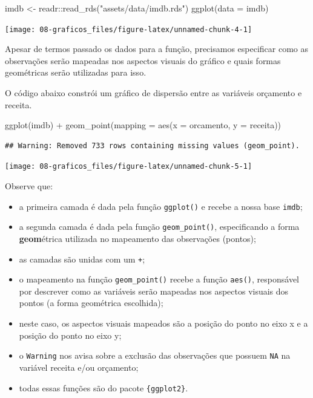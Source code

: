 \documentclass[
]{book}
\newenvironment{Shaded}{\begin{snugshade}}{\end{snugshade}}
\newcommand{\AttributeTok}[1]{\textcolor[rgb]{0.77,0.63,0.00}{#1}}
\newcommand{\FunctionTok}[1]{\textcolor[rgb]{0.00,0.00,0.00}{#1}}
\newcommand{\NormalTok}[1]{#1}
\newcommand{\OtherTok}[1]{\textcolor[rgb]{0.56,0.35,0.01}{#1}}
\newcommand{\SpecialCharTok}[1]{\textcolor[rgb]{0.00,0.00,0.00}{#1}}
\newcommand{\StringTok}[1]{\textcolor[rgb]{0.31,0.60,0.02}{#1}}
\providecommand{\tightlist}{%
  \setlength{\itemsep}{0pt}\setlength{\parskip}{0pt}}
\begin{document}
\begin{Shaded}
\begin{Highlighting}[]
\NormalTok{imdb }\OtherTok{\textless{}{-}}\NormalTok{ readr}\SpecialCharTok{::}\FunctionTok{read\_rds}\NormalTok{(}\StringTok{"assets/data/imdb.rds"}\NormalTok{)}
\FunctionTok{ggplot}\NormalTok{(}\AttributeTok{data =}\NormalTok{ imdb)}
\end{Highlighting}
\end{Shaded}

\begin{center}\texttt{[image: 08-graficos\_files/figure-latex/unnamed-chunk-4-1]} \end{center}

Apesar de termos passado os dados para a função, precisamos especificar como as observações serão mapeadas nos aspectos visuais do gráfico e quais formas geométricas serão utilizadas para isso.

O código abaixo constrói um gráfico de dispersão entre as variáveis orçamento e receita.

\begin{Shaded}
\begin{Highlighting}[]
\FunctionTok{ggplot}\NormalTok{(imdb) }\SpecialCharTok{+}
  \FunctionTok{geom\_point}\NormalTok{(}\AttributeTok{mapping =} \FunctionTok{aes}\NormalTok{(}\AttributeTok{x =}\NormalTok{ orcamento, }\AttributeTok{y =}\NormalTok{ receita))}
\end{Highlighting}
\end{Shaded}

\begin{verbatim}
## Warning: Removed 733 rows containing missing values (geom_point).
\end{verbatim}

\begin{center}\texttt{[image: 08-graficos\_files/figure-latex/unnamed-chunk-5-1]} \end{center}

Observe que:

\begin{itemize}
\tightlist
\item
  a primeira camada é dada pela função \texttt{ggplot()} e recebe a nossa base \texttt{imdb};
\item
  a segunda camada é dada pela função \texttt{geom\_point()}, especificando a forma \textbf{geom}étrica utilizada no mapeamento das observações (pontos);
\item
  as camadas são unidas com um \texttt{+};
\item
  o mapeamento na função \texttt{geom\_point()} recebe a função \texttt{aes()}, responsável por descrever como as variáveis serão mapeadas nos aspectos visuais dos pontos (a forma geométrica escolhida);
\item
  neste caso, os aspectos visuais mapeados são a posição do ponto no eixo x e a posição do ponto no eixo y;
\item
  o \texttt{Warning} nos avisa sobre a exclusão das observações que possuem \texttt{NA} na variável receita e/ou orçamento;
\item
  todas essas funções são do pacote \texttt{\{ggplot2\}}.
\end{itemize}
\end{document}
